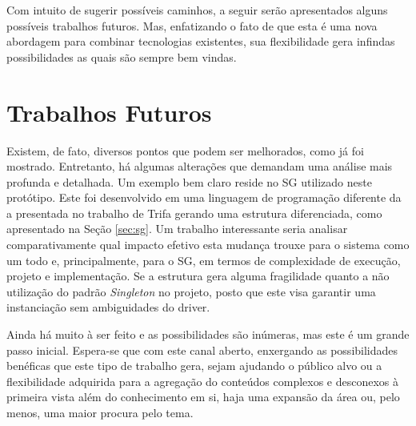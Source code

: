 \documentclass[12pt,a4paper,oneside]{report}
\begin{document}
Com intuito de sugerir possíveis caminhos, a seguir serão apresentados alguns possíveis trabalhos futuros. Mas, enfatizando o fato de que esta é uma nova abordagem para combinar tecnologias existentes, sua flexibilidade gera infindas possibilidades as quais são sempre bem vindas.

\section{Trabalhos Futuros}

Existem, de fato, diversos pontos que podem ser melhorados, como já foi mostrado. Entretanto, há algumas alterações que demandam uma análise mais profunda e detalhada. Um exemplo bem claro reside no SG utilizado neste protótipo. Este foi desenvolvido em uma linguagem de programação diferente da a presentada no trabalho de Trifa\cite{sgtriwiguiboh} gerando uma estrutura diferenciada, como apresentado na Seção \ref{sec:sg}. Um trabalho interessante seria analisar comparativamente qual impacto efetivo esta mudança trouxe para o sistema como um todo e, principalmente, para o SG, em termos de complexidade de execução, projeto e implementação. Se a estrutura gera alguma fragilidade quanto a não utilização do padrão \emph{Singleton} no projeto, posto que este visa garantir uma instanciação sem ambiguidades do driver.

Ainda há muito à ser feito e as possibilidades são inúmeras, mas este é um grande passo inicial. Espera-se que com este canal aberto, enxergando as possibilidades benéficas que este tipo de trabalho gera, sejam ajudando o público alvo ou a flexibilidade adquirida para a agregação do conteúdos complexos e desconexos à primeira vista além do conhecimento em si, haja uma expansão da área ou, pelo menos, uma maior procura pelo tema.



\cleardoublepage
{}
\end{document}
